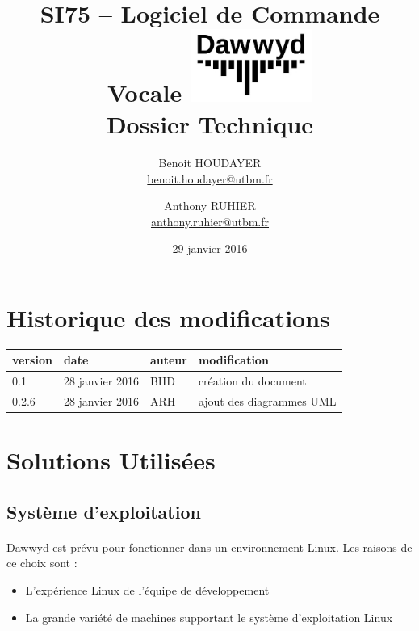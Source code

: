 \documentclass[12pt]{article}
\title{\vspace{-1cm}\textbf{%
    SI75 -- Logiciel de Commande Vocale \vspace{0.5cm}
    \protect\includegraphics[width=4cm]{logo.jpg}\\[0.5em]
    Dossier Technique}}
\author{Benoit HOUDAYER \\ \href{mailto:benoit.houdayer@utbm.fr}{benoit.houdayer@utbm.fr}
\and Anthony RUHIER \\ \href{mailto:anthony.ruhier@utbm.fr}{anthony.ruhier@utbm.fr}}
\date{29 janvier 2016}
\begin{document}
    \maketitle
    \thispagestyle{empty}
    \tableofcontents
    \listoffigures

    \section*{Historique des modifications}

    \begin{table}[H]
    \centering

    \begin{tabular}{|l|l|l|l|}
        \hline
        version & date & auteur & modification \\
        \hline
        0.1 & 28 janvier 2016 & BHD & création du document \\
        0.2.6 & 28 janvier 2016 & ARH & ajout des diagrammes UML \\
        \hline
    \end{tabular}
    \end{table}

    \afterpage{\cfoot{\thepage}}
    \newpage

    \section{Solutions Utilisées}
	    \subsection{Système d'exploitation}
	    \paragraph{}
        Dawwyd est prévu pour fonctionner dans un environnement Linux. Les
        raisons de ce choix sont :
	    \begin{itemize}
	    	\item L'expérience Linux de l'équipe de développement
            \item La grande variété de machines supportant le système
                d'exploitation Linux
	    \end{itemize}

	    \paragraph{}
\end{document}

